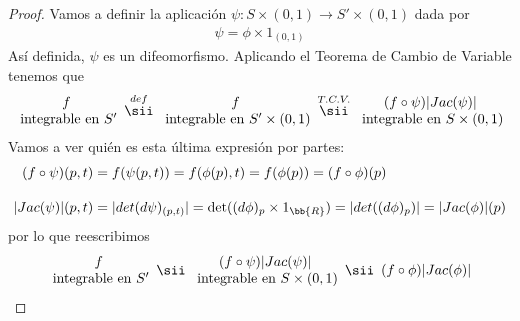 \begin{teo}
    \begin{proof}
        Vamos a definir la aplicación $\psi : S \times (0,1) \to S'\times (0,1)$ dada por 
        \begin{gather*}
            \psi = \phi \times 1_{(0,1)}
        \end{gather*}
        Así definida, $\psi$ es un difeomorfismo. Aplicando el Teorema de Cambio de Variable tenemos que
        \begin{gather*}
            \begin{array}{c}
                f \\
                \text{ integrable en $S'$}
            \end{array}
            \overset{def}{\sii }
            \begin{array}{c}
                f \\
                \text{ integrable en $S'\times (0,1)$}
            \end{array}
            \overset{T.C.V.}{\sii} 
            \begin{array}{c}
                (f\circ \psi)|Jac(\psi)| \\
                \text{ integrable en $S\times(0,1)$}
            \end{array}
        \end{gather*}
        Vamos a ver quién es esta última expresión por partes:
        \begin{align*}
            (f\circ \psi)(p,t) &= f(\psi(p,t)) = f(\phi(p), t) = f(\phi(p)) = (f\circ \phi)(p)\\[1em]
            |Jac(\psi)|(p,t) &= |det(d\psi)_{(p,t)}| = \det((d\phi)_p \times 1_{\bb{R}}) = |det((d\phi)_p)| = |Jac(\phi)|(p)
        \end{align*}
        por lo que reescribimos
        \begin{gather*}
            \begin{array}{c}
                f \\
                \text{ integrable en $S'$}
            \end{array}
            \sii 
            \begin{array}{c}
                (f\circ \psi)|Jac(\psi)| \\
                \text{ integrable en $S\times(0,1)$}
            \end{array}
            \sii 
            \begin{array}{c}
                (f\circ \phi)|Jac(\phi)| \\

\end{array}
\end{gather*}
\end{proof}
\end{teo}
